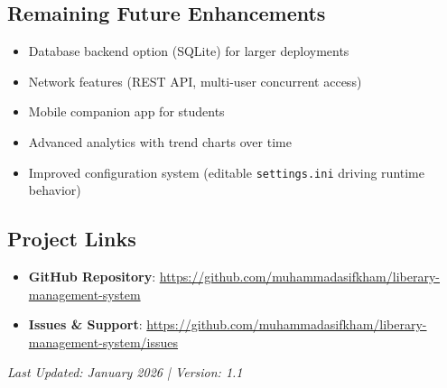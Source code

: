 \documentclass[11pt,a4paper]{article}
\begin{document}
\subsection{Remaining Future Enhancements}
\begin{itemize}
  \item Database backend option (SQLite) for larger deployments
  \item Network features (REST API, multi-user concurrent access)
  \item Mobile companion app for students
  \item Advanced analytics with trend charts over time
  \item Improved configuration system (editable \texttt{settings.ini} driving runtime behavior)
\end{itemize}

\subsection{Project Links}
\begin{itemize}
  \item \textbf{GitHub Repository}: \url{https://github.com/muhammadasifkham/liberary-management-system}
  \item \textbf{Issues \& Support}: \url{https://github.com/muhammadasifkham/liberary-management-system/issues}
\end{itemize}

\vspace{1em}
\textit{Last Updated: January 2026 | Version: 1.1}
\end{document}
